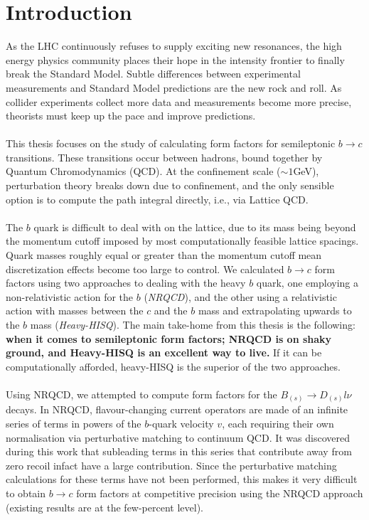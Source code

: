 \chapter{Introduction}
\label{sec:intro}

As the LHC continuously refuses to supply exciting new resonances, the high energy physics community places their hope in the intensity frontier to finally break the Standard Model. Subtle differences between experimental measurements and Standard Model predictions are the new rock and roll. As collider experiments collect more data and measurements become more precise, theorists must keep up the pace and improve predictions.
\\ \\
This thesis focuses on the study of calculating form factors for semileptonic $b\to c$ transitions. These transitions occur between hadrons, bound together by Quantum Chromodynamics (QCD). At the confinement scale ($\sim 1$GeV), perturbation theory breaks down due to confinement, and the only sensible option is to compute the path integral directly, i.e., via Lattice QCD.
\\ \\
The $b$ quark is difficult to deal with on the lattice, due to its mass being beyond the momentum cutoff imposed by most computationally feasible lattice spacings. Quark masses roughly equal or greater than the momentum cutoff mean discretization effects become too large to control. We calculated $b\to c$ form factors using two approaches to dealing with the heavy $b$ quark, one employing a non-relativistic action for the $b$ ({\textit{NRQCD}}), and the other using a relativistic action with masses between the $c$ and the $b$ mass and extrapolating upwards to the $b$ mass ({\textit{Heavy-HISQ}}). The main take-home from this thesis is the following: {\textbf{when it comes to semileptonic form factors; NRQCD is on shaky ground, and Heavy-HISQ is an excellent way to live.}} If it can be computationally afforded, heavy-HISQ is the superior of the two approaches.
\\ \\
Using NRQCD, we attempted to compute form factors for the $B_{(s)}\to D_{(s)}l\nu$ decays. %
In NRQCD, flavour-changing current operators are made of an infinite series of terms in powers of the $b$-quark velocity $v$, each requiring their own normalisation via perturbative matching to continuum QCD. It was discovered during this work that subleading terms in this series that contribute away from zero recoil infact have a large contribution. Since the perturbative matching calculations for these terms have not been performed, this makes it very difficult to obtain $b\to c$ form factors at competitive precision using the NRQCD approach (existing results are at the few-percent level).
